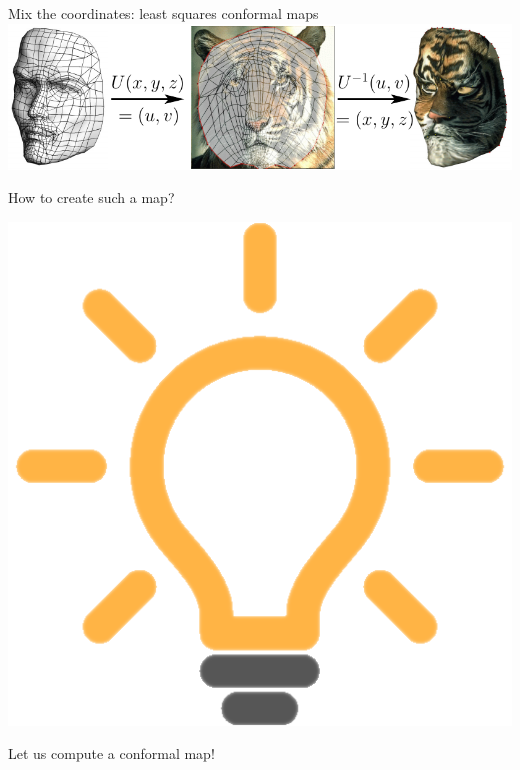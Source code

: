 \documentclass[UKenglish,aspectratio=169]{beamer}
\begin{document}
\begin{frame}
\inputminted[frame=single]{python}{listings/arap.py}
\end{frame}



\begin{frame}{Mix the coordinates: least squares conformal maps}
\includegraphics[width=\linewidth]{../manuscript/img/tex-mapping.pdf}
\pause
\begin{center}
How to create such a map?
\pause

\includegraphics[width=.1\linewidth]{../manuscript/img/idea.png}

Let us compute a conformal map!
\end{center}
\end{frame}
\end{document}
